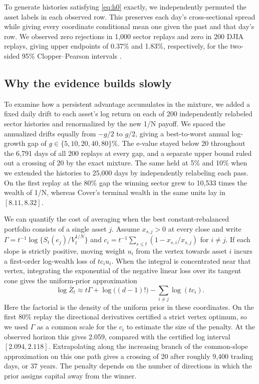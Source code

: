 \documentclass{article}
\numberwithin{equation}{section}
\theoremstyle{remark}
\begin{document}
To generate histories satisfying \eqref{eq:h0} exactly, we independently
permuted the asset labels in each observed row. This preserves each
day's cross-sectional spread while giving every coordinate conditional
mean one given the past and that day's row. We observed zero rejections
in 1,000 sector replays and zero in 200 DJIA replays, giving upper
endpoints of 0.37\% and 1.83\%, respectively, for the two-sided 95\%
Clopper--Pearson intervals \citep{clopper1934}.

\subsection{Why the evidence builds slowly}
To examine how a persistent advantage accumulates in the mixture,
we added a fixed daily drift to each asset's log return on each of 200
independently relabeled sector histories and renormalized by the new
1/N payoff. We spaced the annualized drifts equally from $-g/2$ to
$g/2$, giving a best-to-worst annual log-growth gap of
$g\in\{5,10,20,40,80\}\%$. The e-value stayed below 20 throughout the 6,791 days of all 200
replays at every gap, and a separate upper bound ruled out a crossing
of 20 by the exact mixture. The same held at 5\% and 10\% when we extended the
histories to 25,000 days by independently relabeling each pass. On the first replay at the 80\% gap the
winning sector grew to 10,533 times the wealth of 1/N, whereas Cover's
terminal wealth in the same units lay in $[8.11,8.32]$.

We can quantify the cost of averaging when the best constant-rebalanced
portfolio consists of a single asset $j$. Assume $x_{s,j}>0$ at every
close and write $\Gamma=t^{-1}\log
\{S_t(e_j)/V_t^{1/N}\}$ and $c_i=t^{-1}\sum_{s\le t}
(1-x_{s,i}/x_{s,j})$ for $i\ne j$. If each slope is strictly
positive, moving weight $u_i$ from the vertex towards asset $i$ incurs
a first-order log-wealth loss of $tc_i u_i$. When the integral is
concentrated near that vertex, integrating the exponential of the
negative linear loss over its tangent cone gives the uniform-prior
approximation
\[
 \log\bar Z_t \approx t\Gamma+\log\bigl((d-1)!\bigr)
                         -\sum_{i\ne j}\log(tc_i).
\]
Here the factorial is the density of the uniform prior in these
coordinates. On the first 80\% replay the directional derivatives
certified a strict vertex optimum, so we used $\Gamma$ as a common
scale for the $c_i$ to estimate the size of the penalty. At the
observed horizon this gives 2.059, compared with the certified log
interval $[2.094,2.118]$. Extrapolating along the increasing branch of
the common-slope approximation on this one path gives a crossing of 20
after roughly 9,400 trading days, or 37 years. The penalty depends on the number of directions in which the
prior assigns capital away from the winner.
\end{document}
